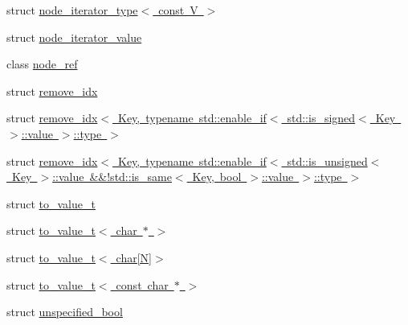 \begin{DoxyCompactItemize}
struct \mbox{\hyperlink{struct_y_a_m_l_1_1detail_1_1node__iterator__type_3_01const_01_v_01_4}{node\+\_\+iterator\+\_\+type$<$ const V $>$}}
\item 
struct \mbox{\hyperlink{struct_y_a_m_l_1_1detail_1_1node__iterator__value}{node\+\_\+iterator\+\_\+value}}
\item 
class \mbox{\hyperlink{class_y_a_m_l_1_1detail_1_1node__ref}{node\+\_\+ref}}
\item 
struct \mbox{\hyperlink{struct_y_a_m_l_1_1detail_1_1remove__idx}{remove\+\_\+idx}}
\item 
struct \mbox{\hyperlink{struct_y_a_m_l_1_1detail_1_1remove__idx_3_01_key_00_01typename_01std_1_1enable__if_3_01std_1_1is5b6d38b30a1fd839e13e20f486d53898}{remove\+\_\+idx$<$ Key, typename std\+::enable\+\_\+if$<$ std\+::is\+\_\+signed$<$ Key $>$\+::value $>$\+::type $>$}}
\item 
struct \mbox{\hyperlink{struct_y_a_m_l_1_1detail_1_1remove__idx_3_01_key_00_01typename_01std_1_1enable__if_3_01std_1_1is35fbbe9db9bd491994160c565f84eb78}{remove\+\_\+idx$<$ Key, typename std\+::enable\+\_\+if$<$ std\+::is\+\_\+unsigned$<$ Key $>$\+::value \&\&!std\+::is\+\_\+same$<$ Key, bool $>$\+::value $>$\+::type $>$}}
\item 
struct \mbox{\hyperlink{struct_y_a_m_l_1_1detail_1_1to__value__t}{to\+\_\+value\+\_\+t}}
\item 
struct \mbox{\hyperlink{struct_y_a_m_l_1_1detail_1_1to__value__t_3_01char_01_5_01_4}{to\+\_\+value\+\_\+t$<$ char $\ast$ $>$}}
\item 
struct \mbox{\hyperlink{struct_y_a_m_l_1_1detail_1_1to__value__t_3_01char[_n]_4}{to\+\_\+value\+\_\+t$<$ char\mbox{[}\+N\mbox{]}$>$}}
\item 
struct \mbox{\hyperlink{struct_y_a_m_l_1_1detail_1_1to__value__t_3_01const_01char_01_5_01_4}{to\+\_\+value\+\_\+t$<$ const char $\ast$ $>$}}
\item 
struct \mbox{\hyperlink{struct_y_a_m_l_1_1detail_1_1unspecified__bool}{unspecified\+\_\+bool}}
\end{DoxyCompactItemize}
